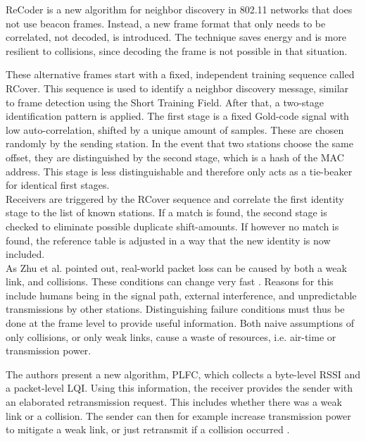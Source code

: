 ReCoder \cite{meng2015} is a new algorithm for neighbor discovery in 802.11 networks that does not use beacon frames. Instead, a new frame format that only needs to be correlated, not decoded, is introduced. The technique saves energy and is more resilient to collisions, since decoding the frame is not possible in that situation.

These alternative frames start with a fixed, independent training sequence called RCover. This sequence is used to identify a neighbor discovery message, similar to frame detection using the Short Training Field. After that, a two-stage identification pattern is applied. The first stage is a fixed Gold-code signal with low auto-correlation, shifted by a unique amount of samples. These are chosen randomly by the sending station. In the event that two stations choose the same offset, they are distinguished by the second stage, which is a hash of the \gls{MAC} address. This stage is less distinguishable and therefore only acts as a tie-beaker for identical first stages.\\

Receivers are triggered by the RCover sequence and correlate the first identity stage to the list of known stations. If a match is found, the second stage is checked to eliminate possible duplicate shift-amounts. If however no match is found, the reference table is adjusted in a way that the new identity is now included.\\

As Zhu et al. pointed out, real-world packet loss can be caused by both a weak link, and collisions. These conditions can change very fast \cite{zhu2015}. Reasons for this include humans being in the signal path, external interference, and unpredictable transmissions by other stations. Distinguishing failure conditions must thus be done at the frame level to provide useful information. Both naive assumptions of only collisions, or only weak links, cause a waste of resources, i.e. air-time or transmission power.

The authors present a new algorithm, \gls{PLFC}, which collects a byte-level \gls{RSSI} and a packet-level \gls{LQI}. Using this information, the receiver provides the sender with an elaborated retransmission request. This includes whether there was a weak link or a collision. The sender can then for example increase transmission power to mitigate a weak link, or just retransmit if a collision occurred \cite{zhu2015}.\\

